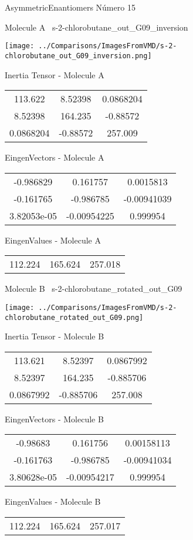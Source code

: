 \vtab[-3cm]
\begin{center}
{\large AsymmetricEnantiomers \tab Número 15}
\end{center}
\begin{multicols}{2}
\begin{center}

Molecule A \
s-2-chlorobutane\_out\_G09\_inversion

\texttt{[image: ../Comparisons/ImagesFromVMD/s-2-chlorobutane\_out\_G09\_inversion.png]}

Inertia Tensor - Molecule A \\
\begin{tabular}{|c c c|}
113.622	 & 	8.52398	 & 	0.0868204	 \\
8.52398	 & 	164.235	 & 	-0.88572	 \\
0.0868204	 & 	-0.88572	 & 	257.009
\end{tabular}

\vtab
 EingenVectors - Molecule A     \\
\begin{tabular}{|c c c|}
-0.986829	 & 	0.161757	 & 	0.0015813	 \\
-0.161765	 & 	-0.986785	 & 	-0.00941039	 \\
3.82053e-05	 & 	-0.00954225	 & 	0.999954
\end{tabular}

\vtab
 EingenValues - Molecule A     \\
\begin{tabular}{|c c c|}
112.224	 & 	165.624	 & 	257.018	 \\
\end{tabular}
\columnbreak

Molecule B \
s-2-chlorobutane\_rotated\_out\_G09

\texttt{[image: ../Comparisons/ImagesFromVMD/s-2-chlorobutane\_rotated\_out\_G09.png]}

Inertia Tensor - Molecule B \\
\begin{tabular}{|c c c|}
113.621	 & 	8.52397	 & 	0.0867992	 \\
8.52397	 & 	164.235	 & 	-0.885706	 \\
0.0867992	 & 	-0.885706	 & 	257.008
\end{tabular}

\vtab
 EingenVectors - Molecule B     \\
\begin{tabular}{|c c c|}
-0.98683	 & 	0.161756	 & 	0.00158113	 \\
-0.161763	 & 	-0.986785	 & 	-0.00941034	 \\
3.80628e-05	 & 	-0.00954217	 & 	0.999954
\end{tabular}

\vtab
 EingenValues - Molecule B     \\
\begin{tabular}{|c c c|}
112.224	 & 	165.624	 & 	257.017	 \\
\end{tabular}

\end{center}
\end{multicols}

